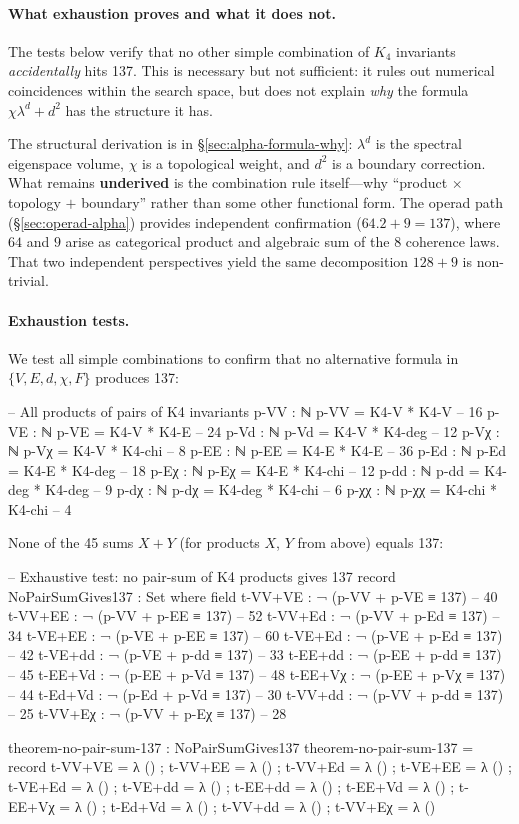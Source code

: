 \documentclass[11pt,a4paper]{book}
\def\cdot{.}%
\begin{document}
\paragraph{What exhaustion proves and what it does not.}
The tests below verify that no other simple combination of $K_4$ invariants
\emph{accidentally} hits 137. This is necessary but not sufficient:
it rules out numerical coincidences within the search space, but does not
explain \emph{why} the formula $\chi\lambda^d + d^2$ has the structure it has.

The structural derivation is in \S\ref{sec:alpha-formula-why}: $\lambda^d$ is
the spectral eigenspace volume, $\chi$ is a topological weight, and $d^2$ is
a boundary correction. What remains \textbf{underived} is the combination rule
itself---why ``product $\times$ topology $+$ boundary'' rather than some other
functional form. The operad path (\S\ref{sec:operad-alpha}) provides independent
confirmation ($64 \cdot 2 + 9 = 137$), where $64$ and $9$ arise as categorical
product and algebraic sum of the 8 coherence laws. That two independent
perspectives yield the same decomposition $128 + 9$ is non-trivial.

\paragraph{Exhaustion tests.}
We test all simple combinations to confirm that no alternative formula
in $\{V, E, d, \chi, F\}$ produces 137:

\begin{code}
-- All products of pairs of K4 invariants
p-VV : ℕ
p-VV = K4-V * K4-V       -- 16
p-VE : ℕ
p-VE = K4-V * K4-E       -- 24
p-Vd : ℕ
p-Vd = K4-V * K4-deg     -- 12
p-Vχ : ℕ
p-Vχ = K4-V * K4-chi     -- 8
p-EE : ℕ
p-EE = K4-E * K4-E       -- 36
p-Ed : ℕ
p-Ed = K4-E * K4-deg     -- 18
p-Eχ : ℕ
p-Eχ = K4-E * K4-chi     -- 12
p-dd : ℕ
p-dd = K4-deg * K4-deg   -- 9
p-dχ : ℕ
p-dχ = K4-deg * K4-chi   -- 6
p-χχ : ℕ
p-χχ = K4-chi * K4-chi   -- 4
\end{code}

None of the 45 sums $X + Y$ (for products $X$, $Y$ from above) equals 137:

\begin{code}
-- Exhaustive test: no pair-sum of K4 products gives 137
record NoPairSumGives137 : Set where
  field
    t-VV+VE : ¬ (p-VV + p-VE ≡ 137)   -- 40
    t-VV+EE : ¬ (p-VV + p-EE ≡ 137)   -- 52
    t-VV+Ed : ¬ (p-VV + p-Ed ≡ 137)   -- 34
    t-VE+EE : ¬ (p-VE + p-EE ≡ 137)   -- 60
    t-VE+Ed : ¬ (p-VE + p-Ed ≡ 137)   -- 42
    t-VE+dd : ¬ (p-VE + p-dd ≡ 137)   -- 33
    t-EE+dd : ¬ (p-EE + p-dd ≡ 137)   -- 45
    t-EE+Vd : ¬ (p-EE + p-Vd ≡ 137)   -- 48
    t-EE+Vχ : ¬ (p-EE + p-Vχ ≡ 137)   -- 44
    t-Ed+Vd : ¬ (p-Ed + p-Vd ≡ 137)   -- 30
    t-VV+dd : ¬ (p-VV + p-dd ≡ 137)   -- 25
    t-VV+Eχ : ¬ (p-VV + p-Eχ ≡ 137)   -- 28

theorem-no-pair-sum-137 : NoPairSumGives137
theorem-no-pair-sum-137 = record
  { t-VV+VE = λ () ; t-VV+EE = λ () ; t-VV+Ed = λ ()
  ; t-VE+EE = λ () ; t-VE+Ed = λ () ; t-VE+dd = λ ()
  ; t-EE+dd = λ () ; t-EE+Vd = λ () ; t-EE+Vχ = λ ()
  ; t-Ed+Vd = λ () ; t-VV+dd = λ () ; t-VV+Eχ = λ ()
  }
\end{code}
\end{document}
